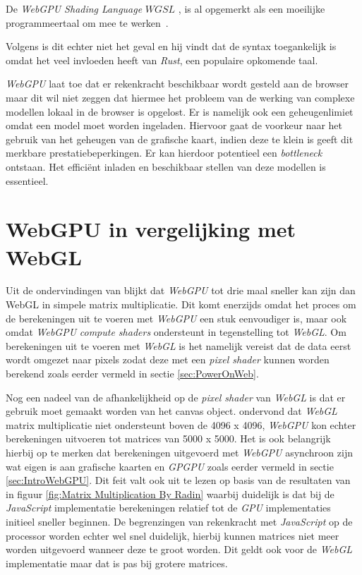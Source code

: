 \bigbreak{}

De \textit{WebGPU Shading Language} \(\textit{WGSL}\) \autocite{W3C2024}, is al opgemerkt als een moeilijke programmeertaal om mee te werken~\autocite{Madrigal2023, Ashton2020}.

Volgens \textcite{Fleetwood2023a} is dit echter niet het geval en hij vindt dat de syntax toegankelijk is omdat het veel invloeden heeft van \textit{Rust}, een populaire opkomende taal.

\bigbreak{}

\textit{WebGPU} laat toe dat er rekenkracht beschikbaar wordt gesteld aan de browser maar dit wil niet zeggen dat hiermee het probleem van de werking van complexe modellen lokaal in de browser is opgelost. Er is namelijk ook een geheugenlimiet omdat een model moet worden ingeladen. Hiervoor gaat de voorkeur naar het gebruik van het geheugen van de grafische kaart, indien deze te klein is geeft dit merkbare prestatiebeperkingen. Er kan hierdoor potentieel een \textit{bottleneck} ontstaan. Het efficiënt inladen en beschikbaar stellen van deze modellen is essentieel.

\section{WebGPU in vergelijking met WebGL}

Uit de ondervindingen van \textcite{Radin2021} blijkt dat \textit{WebGPU} tot drie maal sneller kan zijn dan WebGL in simpele matrix multiplicatie. Dit komt enerzijds omdat het proces om de berekeningen uit te voeren met \textit{WebGPU} een stuk eenvoudiger is, maar ook omdat \textit{WebGPU} \textit{compute shaders} ondersteunt in tegenstelling tot \textit{WebGL}. Om berekeningen uit te voeren met \textit{WebGL} is het namelijk vereist dat de data eerst wordt omgezet naar pixels zodat deze met een \textit{pixel shader} kunnen worden berekend zoals eerder vermeld in sectie \ref{sec:PowerOnWeb}. 

\bigbreak{}

Nog een nadeel van de afhankelijkheid op de \textit{pixel shader} van \textit{WebGL} is dat er gebruik moet gemaakt worden van het canvas object. \textcite{Radin2021} ondervond dat \textit{WebGL} matrix multiplicatie niet ondersteunt boven de 4096 x 4096, \textit{WebGPU} kon echter berekeningen uitvoeren tot matrices van 5000 x 5000. Het is ook belangrijk hierbij op te merken dat berekeningen uitgevoerd met \textit{WebGPU} asynchroon zijn wat eigen is aan grafische kaarten en \textit{GPGPU} zoals eerder vermeld in sectie \ref{sec:IntroWebGPU}. Dit feit valt ook uit te lezen op basis van de resultaten van \textcite{Radin2021} in figuur \ref{fig:Matrix Multiplication By Radin} waarbij duidelijk is dat bij de \textit{JavaScript} implementatie berekeningen relatief tot de \textit{GPU} implementaties initieel sneller beginnen. De begrenzingen van rekenkracht met \textit{JavaScript} op de processor worden echter wel snel duidelijk, hierbij kunnen matrices niet meer worden uitgevoerd wanneer deze te groot worden. Dit geldt ook voor de \textit{WebGL} implementatie maar dat is pas  bij grotere matrices.

